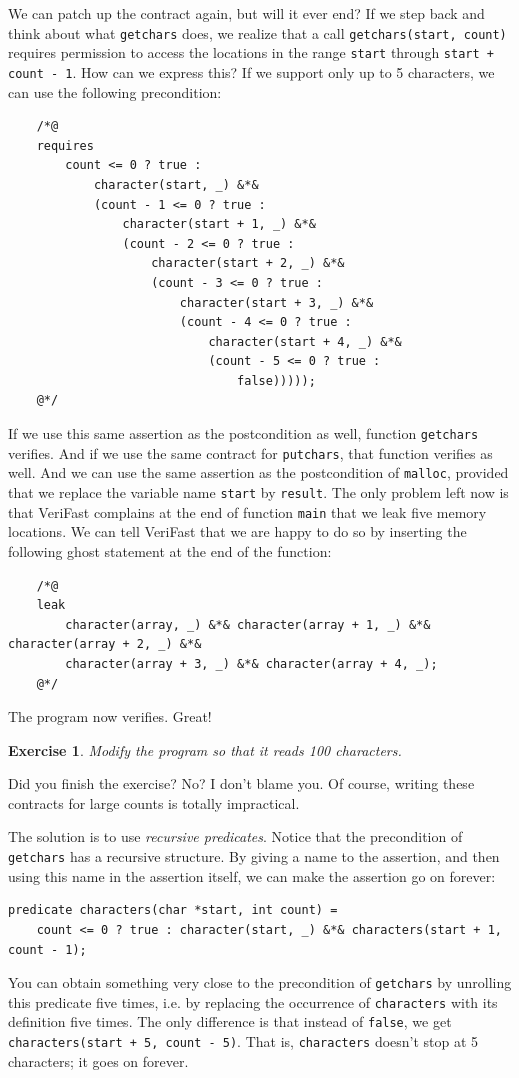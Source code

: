 \documentclass{article}
\newtheorem{exercise}{Exercise}
\begin{document}
We can patch up the contract again, but will it ever end? If we step back and think about what \lstinline!getchars! does, we realize that
a call \lstinline!getchars(start, count)! requires permission to access the locations in the range \lstinline!start! through \lstinline!start + count - 1!.
How can we express this? If we support only up to 5 characters, we can use the following precondition:
\begin{lstlisting}
    /*@
    requires
        count <= 0 ? true :
            character(start, _) &*&
            (count - 1 <= 0 ? true :
                character(start + 1, _) &*&
                (count - 2 <= 0 ? true :
                    character(start + 2, _) &*&
                    (count - 3 <= 0 ? true :
                        character(start + 3, _) &*&
                        (count - 4 <= 0 ? true :
                            character(start + 4, _) &*&
                            (count - 5 <= 0 ? true :
                                false)))));
    @*/
\end{lstlisting}
If we use this same assertion as the postcondition as well, function \lstinline!getchars! verifies.
And if we use the same contract for \lstinline!putchars!, that function verifies as well.
And we can use the same assertion as the postcondition of \lstinline!malloc!, provided that we
replace the variable name \lstinline!start! by \lstinline!result!.
The only problem left now is that VeriFast complains at the end of function \lstinline!main! that
we leak five memory locations. We can tell VeriFast that we are happy to do so by inserting the following
ghost statement at the end of the function:
\begin{lstlisting}
    /*@
    leak
        character(array, _) &*& character(array + 1, _) &*& character(array + 2, _) &*&
        character(array + 3, _) &*& character(array + 4, _);
    @*/
\end{lstlisting}
The program now verifies. Great!
\begin{exercise}\label{exercise:characters}
Modify the program so that it reads 100 characters.
\end{exercise}
Did you finish the exercise? No? I don't blame you. Of course, writing these contracts for large counts is totally impractical.

The solution is to use \emph{recursive predicates}. Notice that the precondition of \lstinline!getchars! has a recursive structure. By giving a name to the assertion,
and then using this name in the assertion itself, we can make the assertion go on forever:
\begin{lstlisting}
predicate characters(char *start, int count) =
    count <= 0 ? true : character(start, _) &*& characters(start + 1, count - 1);
\end{lstlisting}
You can obtain something very close to the precondition of \lstinline!getchars! by unrolling this predicate five times, i.e. by replacing the occurrence of \lstinline!characters!
with its definition five times. The only difference is that instead of \lstinline!false!, we get \lstinline!characters(start + 5, count - 5)!. That is, \lstinline!characters! doesn't stop
at 5 characters; it goes on forever.
\end{document}
